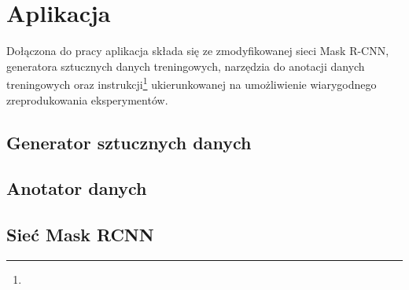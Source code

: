 \chapter{Aplikacja}

Dołączona do pracy aplikacja składa się ze zmodyfikowanej sieci Mask R-CNN, generatora sztucznych danych treningowych, narzędzia do anotacji danych treningowych oraz instrukcji\footnote{} ukierunkowanej na umożliwienie wiarygodnego zreprodukowania eksperymentów.
\\

\section{Generator sztucznych danych}


\section{Anotator danych}


\section{Sieć Mask RCNN}

